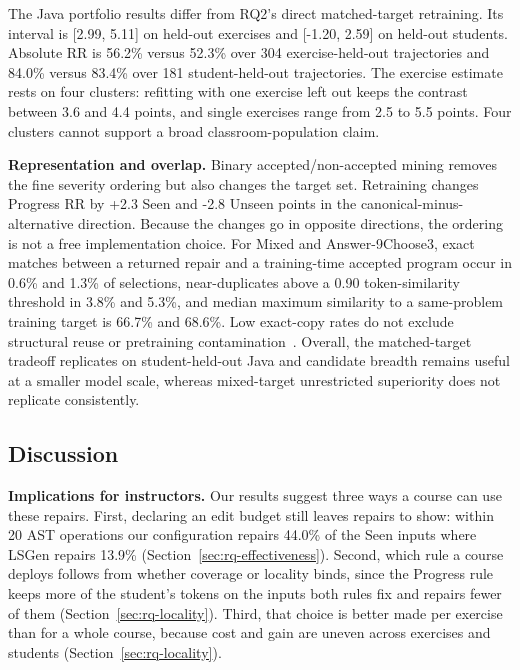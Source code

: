 \documentclass[10pt,conference]{IEEEtran}
\begin{document}
The Java portfolio results differ from RQ2's direct matched-target retraining. Its interval is [2.99, 5.11] on held-out exercises and [-1.20, 2.59] on held-out students. Absolute RR is 56.2\% versus 52.3\% over 304 exercise-held-out trajectories and 84.0\% versus 83.4\% over 181 student-held-out trajectories. The exercise estimate rests on four clusters: refitting with one exercise left out keeps the contrast between 3.6 and 4.4 points, and single exercises range from 2.5 to 5.5 points. Four clusters cannot support a broad classroom-population claim.

\noindent\textbf{Representation and overlap.} Binary accepted/non-accepted mining removes the fine severity ordering but also changes the target set. Retraining changes Progress RR by +2.3 Seen and -2.8 Unseen points in the canonical-minus-alternative direction. Because the changes go in opposite directions, the ordering is not a free implementation choice. For Mixed and Answer-9Choose3, exact matches between a returned repair and a training-time accepted program occur in 0.6\% and 1.3\% of selections, near-duplicates above a 0.90 token-similarity threshold in 3.8\% and 5.3\%, and median maximum similarity to a same-problem training target is 66.7\% and 68.6\%. Low exact-copy rates do not exclude structural reuse or pretraining contamination~\cite{allamanis2019adverse}. Overall, the matched-target tradeoff replicates on student-held-out Java and candidate breadth remains useful at a smaller model scale, whereas mixed-target unrestricted superiority does not replicate consistently.

\subsection{Discussion}

\noindent\textbf{Implications for instructors.} Our results suggest three ways a course can use these repairs. First, declaring an edit budget still leaves repairs to show: within 20 AST operations our configuration repairs 44.0\% of the Seen inputs where LSGen repairs 13.9\% (Section~\ref{sec:rq-effectiveness}). Second, which rule a course deploys follows from whether coverage or locality binds, since the Progress rule keeps more of the student's tokens on the inputs both rules fix and repairs fewer of them (Section~\ref{sec:rq-locality}). Third, that choice is better made per exercise than for a whole course, because cost and gain are uneven across exercises and students (Section~\ref{sec:rq-locality}).
\end{document}
